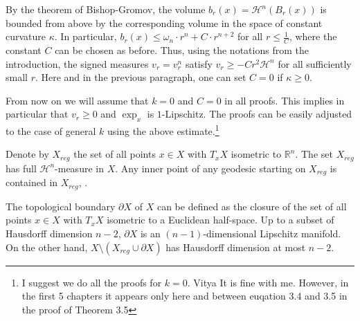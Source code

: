 \documentclass[12pt,leqno]{amsart}
\numberwithin{equation}{section}
\theoremstyle{definition}
\theoremstyle{remark}
\newcommand{\R}{\mathbb{R}}
\begin{document}
By the theorem of Bishop-Gromov, the volume $b_r (x)=\mathcal H^n (B_r(x))$ is bounded from above by the corresponding volume in the
space of constant curvature $\kappa$. In particular, $b_r (x) \leq \omega _n \cdot r^n + C \cdot r^{n+2}$ for all $r\leq \frac 1 C$, where
the constant $C$ can be chosen as before.  Thus, using the notations from the introduction, the signed measures $v_r  =v_r^n $ satisfy
$v_r \geq -Cr^2 \mathcal H^n$  for all sufficiently small $r$.
 Here and in the previous paragraph,  one can set $C=0$ if $\kappa \geq 0$.

 {\color{red} From now on we will assume that $k=0$ and $C=0$ in all proofs. This implies in particular that $v_r\ge 0$ and $\exp_x$ is $1$-Lipschitz. The proofs can be  easily adjusted to the case of general $k$ using the above estimate.}\footnote{{\color{red}I suggest we do all the proofs for $k=0$. Vitya}  It is fine with me. However, in the first 5 chapters it appears only here and  between euqation 3.4 and 3.5 in the proof of Theorem 3.5} 


Denote by $X_{reg}$ the set of all points $x\in X$ with $T_xX$   isometric to $\R^n$.  The set $X_{reg}$ has full $\mathcal H^n$-measure in $X$.
Any inner point of any geodesic starting on $X_{reg}$ is contained in $X_{reg}$, \cite{Petparallel}.


The topological boundary $\partial X$ of $X$ can be defined as the closure of the  set of all points $x\in X$ with $T_xX$ isometric to a Euclidean half-space. Up to a subset of Hausdorff dimension $n-2$, $\partial X$ is an $(n-1)$-dimensional Lipschitz manifold. On the other hand, $X\setminus (X_{reg} \cup \partial X)$ has Hausdorff dimension at most $n-2$.
\end{document}
